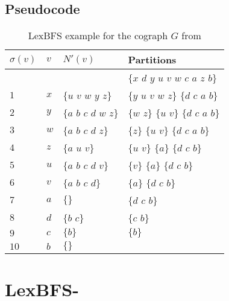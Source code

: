\subsection{Pseudocode}
\label{pseudocode_lexbfs}

\begin{table}[H]
\centering
\begin{tabular}[,]{ | p{6mm} | p{3mm} | p{25mm} |  p{35mm} | }
\hline
 $\sigma(v)$ & $v$ & $N'(v)$ & Partitions \\ [0.5ex] 
 \hline\hline
 & & & $\{x$ $d$ $y$ $u$ $v$ $w$ $c$ $a$ $z$ $b\}$ \\
 \hline
 $1$ & $x$ & $\{u$ $v$ $w$ $y$ $z\}$ & $\{y$ $u$ $v$ $w$ $z\}$ $\{d$ $c$ $a$ $b\}$ \\
 \hline
 $2$ & $y$ & $\{a$ $b$ $c$ $d$ $w$ $z\}$ & $\{w$ $z\}$ $\{u$ $v\}$ $\{d$ $c$ $a$ $b\}$ \\
 \hline
 $3$ & $w$ & $\{a$ $b$ $c$ $d$ $z\}$ & $\{z\}$ $\{u$ $v\}$ $\{d$ $c$ $a$ $b\}$ \\
 \hline
 $4$ & $z$ & $\{a$ $u$ $v\}$ & $\{u$ $v\}$ $\{a\}$ $\{d$ $c$ $b\}$ \\
 \hline
 $5$ & $u$ & $\{a$ $b$ $c$ $d$ $v\}$ & $\{v\}$ $\{a\}$ $\{d$ $c$ $b\}$ \\
 \hline
 $6$ & $v$ & $\{a$ $b$ $c$ $d\}$ & $\{a\}$ $\{d$ $c$ $b\}$ \\
 \hline
 $7$ & $a$ & $\{\}$ & $\{d$ $c$ $b\}$ \\
 \hline
 $8$ & $d$ & $\{b$ $c\}$ & $\{c$ $b\}$ \\
 \hline
 $9$ & $c$ & $\{b\}$ & $\{b\}$ \\
 \hline
 $10$ & $b$ & $\{\}$ &  \\
 \hline
 \end{tabular}
 \caption{LexBFS example for the cograph $G$ from }
    \label{tab:table}
 \end{table}
\section{LexBFS-}
